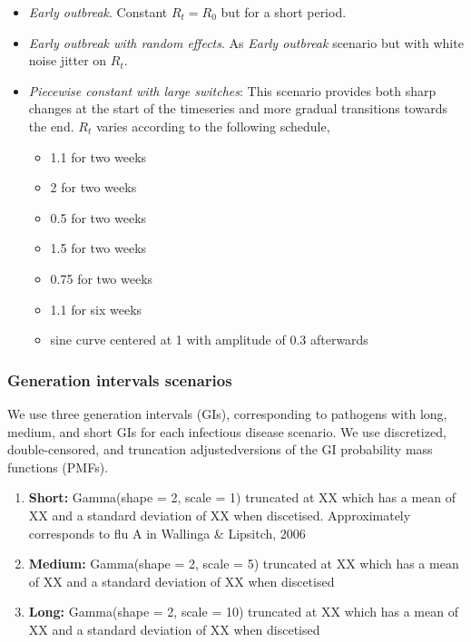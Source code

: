 \documentclass{getwriting}
\begin{document}
\begin{itemize}
    \item \textit{Early outbreak}. Constant $R_t = R_0$ but for a short period.
    \item \textit{Early outbreak with random effects}. As \textit{Early outbreak} scenario but with white noise jitter on $R_t$.
    \item \textit{Piecewise constant with large switches}: This scenario provides both sharp changes at the start of the timeseries and more gradual transitions towards the end. $R_t$ varies according to the following schedule,
    \begin{itemize}
        \item  1.1 for two weeks
        \item 2 for two weeks
        \item 0.5 for two weeks
        \item 1.5 for two weeks
        \item 0.75 for two weeks
        \item 1.1 for six weeks
        \item sine curve centered at 1 with amplitude of 0.3 afterwards
    \end{itemize}
\end{itemize}

\subsubsection{Generation intervals scenarios}

We use three generation intervals (GIs), corresponding to pathogens with long, medium, and short GIs for each infectious disease scenario. We use discretized, double-censored, and truncation adjustedversions of the GI probability mass functions (PMFs).
\begin{enumerate}
    \item \textbf{Short:} Gamma(shape = 2, scale = 1) truncated at XX which has a mean of XX and a standard deviation of XX when discetised. Approximately corresponds to flu A in Wallinga \& Lipsitch, 2006
    \item \textbf{Medium:} Gamma(shape = 2, scale = 5) truncated at XX which has a mean of XX and a standard deviation of XX when discetised
    \item \textbf{Long:} Gamma(shape = 2, scale = 10) truncated at XX which has a mean of XX and a standard deviation of XX when discetised
\end{enumerate}
\end{document}
